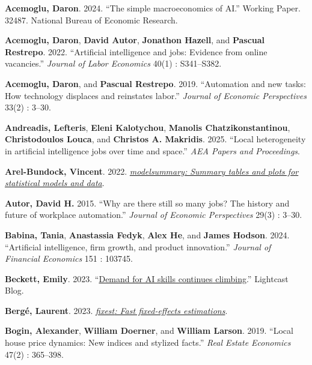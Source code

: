 \documentclass[
]{article}
\newlength{\cslhangindent}
\newenvironment{CSLReferences}[2] %
 {\begin{list}{}{%
  \setlength{\itemindent}{0pt}
  \setlength{\leftmargin}{0pt}
  \setlength{\parsep}{0pt}
  \ifodd #1
   \setlength{\leftmargin}{\cslhangindent}
   \setlength{\itemindent}{-1\cslhangindent}
  \fi
  \setlength{\itemsep}{#2\baselineskip}}}
 {\end{list}}
\begin{document}
\label{refs}
\begin{CSLReferences}{1}{0}
\textbf{Acemoglu, Daron}. 2024. {``The simple macroeconomics of AI.''}
Working Paper. 32487. National Bureau of Economic Research.

\textbf{Acemoglu, Daron}, \textbf{David Autor}, \textbf{Jonathon
Hazell}, and \textbf{Pascual Restrepo}. 2022. {``Artificial intelligence
and jobs: Evidence from online vacancies.''} \emph{Journal of Labor
Economics} 40(1) : S341--S382.

\textbf{Acemoglu, Daron}, and \textbf{Pascual Restrepo}. 2019.
{``Automation and new tasks: How technology displaces and reinstates
labor.''} \emph{Journal of Economic Perspectives} 33(2) : 3--30.

\textbf{Andreadis, Lefteris}, \textbf{Eleni Kalotychou}, \textbf{Manolis
Chatzikonstantinou}, \textbf{Christodoulos Louca}, and \textbf{Christos
A. Makridis}. 2025. {``Local heterogeneity in artificial intelligence
jobs over time and space.''} \emph{AEA Papers and Proceedings}.

\textbf{Arel-Bundock, Vincent}. 2022.
\emph{\href{https://CRAN.R-project.org/package=modelsummary}{{modelsummary}:
Summary tables and plots for statistical models and data}}.

\textbf{Autor, David H.} 2015. {``Why are there still so many jobs? The
history and future of workplace automation.''} \emph{Journal of Economic
Perspectives} 29(3) : 3--30.

\textbf{Babina, Tania}, \textbf{Anastassia Fedyk}, \textbf{Alex He}, and
\textbf{James Hodson}. 2024. {``Artificial intelligence, firm growth,
and product innovation.''} \emph{Journal of Financial Economics} 151 :
103745.

\textbf{Beckett, Emily}. 2023. {``\href{https://lightcast.io/}{Demand
for AI skills continues climbing}.''} Lightcast Blog.

\textbf{Bergé, Laurent}. 2023.
\emph{\href{https://CRAN.R-project.org/package=fixest}{{fixest}: Fast
fixed-effects estimations}}.

\textbf{Bogin, Alexander}, \textbf{William Doerner}, and \textbf{William
Larson}. 2019. {``Local house price dynamics: New indices and stylized
facts.''} \emph{Real Estate Economics} 47(2) : 365--398.


\end{CSLReferences}
\end{document}
